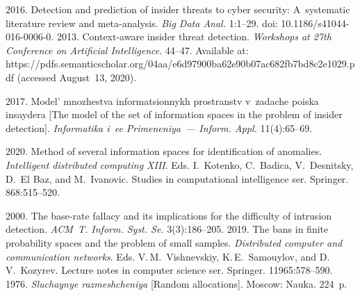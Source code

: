 
 \begin{multicols}{2}

\renewcommand{\bibname}{\protect\rmfamily References}

{\small\frenchspacing
 {%
 \begin{thebibliography}{9}
 2016. Detection and prediction of insider threats to cyber security: 
A~systematic literature review and meta-analysis. 
\textit{Big Data Anal.} 1:1--29.
doi: 10.1186/s41044-016-0006-0.
 2013. Context-aware insider threat detection. 
\textit{Workshops at 27th Conference on Artificial Intelligence}. 44--47.
Available at:
 {\sf 
https://pdfs.semanticscholar.org/04aa/e6d97900ba62e9\linebreak 0b07ac682fb7bd8c2e1029.pdf}
(accessed August~13, 2020).

 2017. Model' 
mnozhestva informatsionnykh prostranstv v~zadache poiska insaydera [The model of the set of 
information spaces in the problem of insider detection]. \textit{Informatika i~ee Primeneniya~--- 
Inform. Appl.} 11(4):65--69.

 2020. Method of several information spaces for 
identification of anomalies. \textit{Intelligent distributed computing XIII}. Eds. I.~Kotenko, 
C.~Badica, V.~Desnitsky, D.~El Baz, and M.~Ivanovic. Studies in computational intelligence ser. 
Springer. 868:515--520.

 2000. The base-rate fallacy and its implications for the difficulty of intrusion 
detection. \textit{ACM~T. Inform. Syst. Se.} 3(3):186--205.
 2019. The bans in finite probability spaces and the 
problem of small samples. \textit{Distributed computer and communication networks}. Eds. 
V.\,M.~Vishnevskiy, K.\,E.~Samouylov, and D.\,V.~Kozyrev. Lecture notes in computer science ser. 
Springer. 11965:578--590.
 1976. 
\textit{Sluchaynye 
razmeshcheniya} [Random allocations]. Moscow: Nauka. 224~p.
\end{thebibliography}

 }
 }

\end{multicols}


